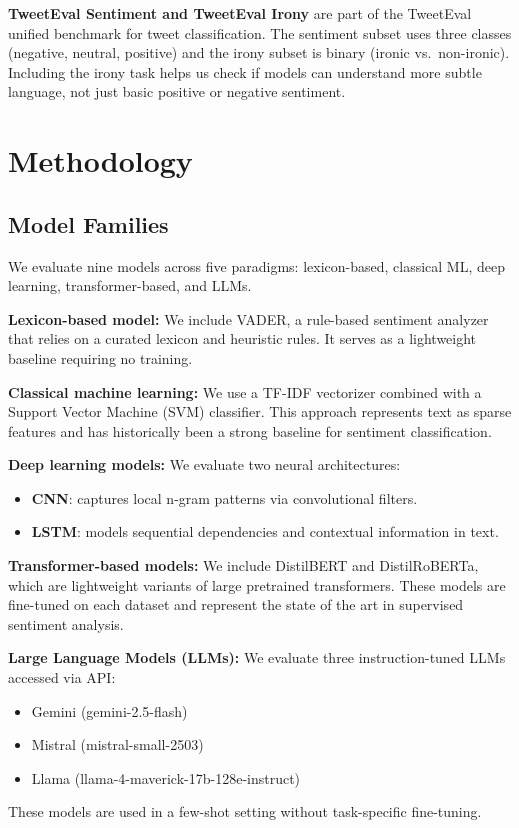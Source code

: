 \documentclass[conference]{IEEEtran}
\begin{document}
\textbf{TweetEval Sentiment and TweetEval Irony} \cite{barbieri2020tweeteval} are part of the TweetEval unified benchmark for tweet classification. The sentiment subset uses three classes (negative, neutral, positive) and the irony subset is binary (ironic vs.\ non-ironic). Including the irony task helps us check if models can understand more subtle language, not just basic positive or negative sentiment.

\section{Methodology}
\label{sec:methodology}

\subsection{Model Families}

We evaluate nine models across five paradigms: lexicon-based, classical ML, deep learning, transformer-based, and LLMs.

\textbf{Lexicon-based model:}
We include VADER, a rule-based sentiment analyzer that relies on a curated lexicon and heuristic rules. It serves as a lightweight baseline requiring no training.

\textbf{Classical machine learning:}
We use a TF-IDF vectorizer combined with a Support Vector Machine (SVM) classifier. This approach represents text as sparse features and has historically been a strong baseline for sentiment classification.

\textbf{Deep learning models:}
We evaluate two neural architectures:
\begin{itemize}
\item \textbf{CNN}: captures local n-gram patterns via convolutional filters.
\item \textbf{LSTM}: models sequential dependencies and contextual information in text.
\end{itemize}

\textbf{Transformer-based models:}
We include DistilBERT and DistilRoBERTa, which are lightweight variants of large pretrained transformers. These models are fine-tuned on each dataset and represent the state of the art in supervised sentiment analysis.

\textbf{Large Language Models (LLMs):}
We evaluate three instruction-tuned LLMs accessed via API:
\begin{itemize}
\item Gemini (gemini-2.5-flash)
\item Mistral (mistral-small-2503)
\item Llama (llama-4-maverick-17b-128e-instruct)
\end{itemize}
These models are used in a few-shot setting without task-specific fine-tuning.
\end{document}
